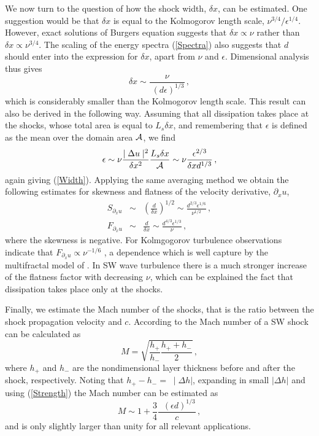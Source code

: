 \documentclass{jfm}
\begin{document}
We now turn to the question of how the shock width, $ \delta x $, can be estimated. One suggestion would be that $ \delta x $  is equal to the Kolmogorov length scale, $ \nu^{3/4}/\epsilon^{1/4} $. However, exact solutions of Burgers equation \cite[see for example][]{Whitham}
suggests that  $ \delta x \propto \nu $ rather than $ \delta x \propto \nu ^{3/4} $. The scaling of the energy spectra (\ref{Spectra}) also suggests that $ d $ should enter into the expression for $ \delta x$, apart from $ \nu $ and $ \epsilon $. Dimensional analysis thus gives
\begin{equation} \label{Width}
\delta x \sim \frac{\nu}{\; (d\epsilon)^{1/3}} \, ,
\end{equation} 
which is considerably smaller than the Kolmogorov length scale.
This result can also be derived in the following way. Assuming that all dissipation takes place at the shocks, whose total area is equal to $ L_s \delta x $,  and remembering that $ \epsilon $ is defined as the mean over the domain area $ \cal  A$, we find
\begin{equation} \label{Estimate}
\epsilon \sim \nu \frac{ \mid \Delta u \mid ^{2} }{\delta x^2} \frac{L_s \delta x}{\cal{A}} \sim \nu \frac{\epsilon^{2/3}} {\delta x d^{1/3}} \, ,
\end{equation} 
again giving (\ref{Width}). 
Applying the same averaging method we obtain the following estimates for skewness and flatness of the velocity derivative, $ \partial_x u $,
\begin{eqnarray}
S_{\partial_x u}  & \sim & \left ( \frac{d}{\delta x} \right )^{1/2} \sim \frac{d^{2/3} \epsilon ^{1/6}}{\nu^{1/2}} \, , \\
\label{FD} F_{\partial_x u} & \sim &  \frac{d}{\delta x} \sim \frac{d^{4/3} \epsilon^{1/3}} {\nu} \, ,
\end{eqnarray} 
where the skewness is negative. For Kolmgogorov turbulence observations indicate that $ F_{\partial_x u} \propto \nu^{-1/6} $  \cite[]{VanAtta_Antonia1980}, a dependence which is well capture by the multifractal model of
\cite{Meneveau_Streenivasan1991}.  In SW wave turbulence there is a much stronger increase of  the flatness factor with decreasing  $ \nu $, which can be explained the fact that dissipation takes place only at the shocks.

Finally, we estimate the Mach number of the shocks, that is the ratio between the shock propagation velocity and $ c $. According to \cite{Baines1998} the Mach number of a SW shock can be calculated as
\begin{equation}
M = \sqrt{\frac{h_+}{h_-} \frac{h_+  + h_-}{2}} \, ,
\end{equation} 
where $ h_+ $ and $ h_- $ are the nondimensional layer thickness before and after the shock, respectively. Noting that $ h_+ - h_- =  \;  \mid \!\! \Delta h | $, expanding in small $ | \Delta h | $ and using (\ref{Strength}) the Mach number can be estimated as
\begin{equation} \label{Mach}
M \sim 1 + \frac{3}{4} \frac{\;\; (\epsilon d)^{1/3}}{c} \, ,
\end{equation} 
and is only slightly larger than unity for all relevant applications.
\end{document}
